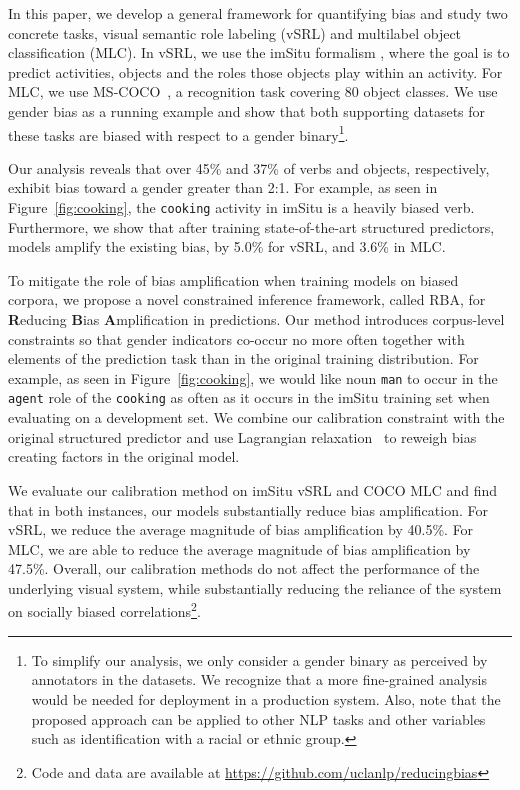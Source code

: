 In this paper, we develop a general framework for quantifying bias and
study two concrete tasks, visual semantic role labeling (vSRL) and multilabel object classification (MLC). 
In vSRL, we use the imSitu formalism \cite{yatskar2016situation,yatskar2016commonly}, where the goal is to predict activities, objects and the roles those objects play within an activity.
For MLC, we use MS-COCO~\cite{lin2014microsoft,chen2015microsoft}, a recognition task covering 80 object classes.
 We use gender bias as a running example and show that both supporting datasets for these tasks are biased with respect to a gender binary\footnote{To simplify our analysis, we only consider a gender binary as perceived by annotators in the datasets. We recognize that a more fine-grained analysis would be needed for deployment in a production system. Also, note that the proposed approach can be applied to other NLP tasks and other variables such as identification with a racial or ethnic group.}.
 
Our analysis reveals that over 45\% and 37\% of verbs and objects, respectively, exhibit bias toward a gender greater than 2:1. 
For example, as seen in Figure~\ref{fig:cooking}, the \texttt{cooking} activity in imSitu is a heavily biased verb.
Furthermore, we show that after training state-of-the-art structured predictors, models amplify the existing bias, by 5.0\% for vSRL, and 3.6\% in MLC.

To mitigate the role of bias amplification when training models on biased corpora, we propose a novel constrained inference framework, called RBA, for {\bf R}educing {\bf B}ias {\bf A}mplification in predictions. Our method introduces corpus-level constraints so that gender indicators co-occur no more often together with elements of the prediction task than in the original training distribution. 
For example, as seen in Figure~\ref{fig:cooking}, we would like noun \texttt{man} to occur in the \texttt{agent} role of the \texttt{cooking} as often as it occurs in the imSitu training set when evaluating on a development set.
We combine our calibration constraint with the original structured predictor and use Lagrangian relaxation~\cite{korte08,Rush2012} to reweigh bias creating factors in the original model.

We evaluate our calibration method on imSitu vSRL and COCO MLC and find that in both instances, our models substantially reduce bias amplification. 
For vSRL, we reduce the average magnitude of bias amplification by 40.5\%. 
For MLC, we are able to reduce the average magnitude of bias amplification by 47.5\%. 
Overall, our calibration methods do not affect the performance of the underlying visual system, while substantially reducing the reliance of the system on socially biased correlations\footnote{Code and data are available at \url{https://github.com/uclanlp/reducingbias}}.


